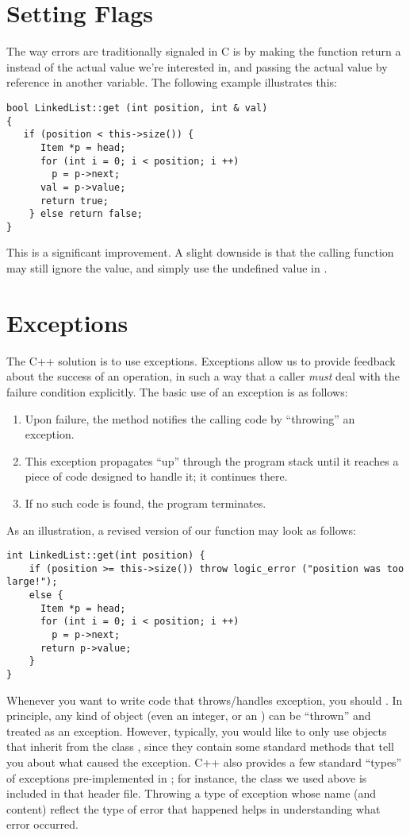 \section{Setting Flags}
The way errors are traditionally signaled in C is by making the
function return a  instead of the actual value we're
interested in, and passing the actual value by reference in another
variable. The following example illustrates this:

\begin{verbatim}
bool LinkedList::get (int position, int & val) 
{
   if (position < this->size()) {
      Item *p = head;
      for (int i = 0; i < position; i ++)
        p = p->next;
      val = p->value;
      return true;
    } else return false;
}
\end{verbatim}

This is a significant improvement. A slight downside is that the
calling function may still ignore the  value, and simply
use the undefined value in . 

\section{Exceptions}
The C++ solution is to use exceptions. 
Exceptions allow us to provide feedback about the success of an
operation, in such a way that a caller \emph{must} deal with the
failure condition explicitly.
The basic use of an exception is as follows: 

\begin{enumerate}
\item Upon failure, the method notifies the calling code by
  ``throwing'' an exception.
\item This exception propagates ``up'' through the program stack until
  it reaches a piece of code designed to handle it; it continues
  there. 
\item If no such code is found, the program terminates. 
\end{enumerate}
	
As an illustration, a revised version of our  function may
look as follows:
\begin{verbatim}
int LinkedList::get(int position) {
    if (position >= this->size()) throw logic_error ("position was too large!");
    else {
      Item *p = head;
      for (int i = 0; i < position; i ++)
        p = p->next;
      return p->value;
    }
}
\end{verbatim}

Whenever you want to write code that throws/handles exception, you
should .
In principle, any kind of object (even an integer, or an
) can be ``thrown'' and treated as an exception.
However, typically, you would like to only use objects that inherit
from the class , since they contain some standard
methods that tell you about what caused the exception.
C++ also provides a few standard ``types'' of exceptions
pre-implemented in ; for instance, the
class  we used above is included in that header
file. Throwing a type of exception whose name (and content) reflect
the type of error that happened helps in understanding what error
occurred.

